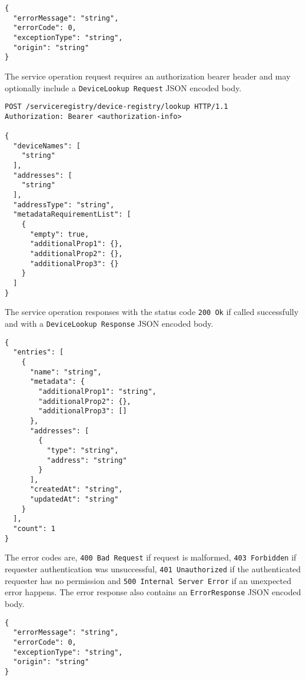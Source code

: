\documentclass[a4paper]{arrowhead}
\newcommand{\fref}[1]{{\textcolor{ArrowheadBlue}{\hyperref[sec:functions:#1]{#1}}}}
\begin{document}
\begin{lstlisting}[language=http,label={lst:register_response},caption={A \fref{register} error response.}]
{
  "errorMessage": "string",
  "errorCode": 0,
  "exceptionType": "string",
  "origin": "string"
}
\end{lstlisting}


The service operation request requires an authorization bearer header and may optionally include a \texttt{DeviceLookup
Request} JSON encoded body.

\begin{lstlisting}[language=http,label={lst:register},caption={A \fref{lookup} request.}]
POST /serviceregistry/device-registry/lookup HTTP/1.1
Authorization: Bearer <authorization-info>

{
  "deviceNames": [
    "string"
  ],
  "addresses": [
    "string"
  ],
  "addressType": "string",
  "metadataRequirementList": [
    {
      "empty": true,
      "additionalProp1": {},
      "additionalProp2": {},
      "additionalProp3": {}
    }
  ]
}
\end{lstlisting}

The service operation responses with the status code \texttt{200 Ok} if called successfully and with a \texttt{DeviceLookup
Response} JSON encoded body.

\begin{lstlisting}[language=http,label={lst:register_response},caption={A \fref{lookup} success response.}]
{
  "entries": [
    {
      "name": "string",
      "metadata": {
        "additionalProp1": "string",
        "additionalProp2": {},
        "additionalProp3": []
      },
      "addresses": [
        {
          "type": "string",
          "address": "string"
        }
      ],
      "createdAt": "string",
      "updatedAt": "string"
    }
  ],
  "count": 1
}
\end{lstlisting}

\newpage

The error codes are, \texttt{400 Bad Request} if request is malformed, \texttt{403 Forbidden} if requester authentication was unsuccessful, \texttt{401 Unauthorized} if the authenticated requester has no permission and \texttt{500 Internal Server Error} if an unexpected error happens. The error response also contains an \texttt{ErrorResponse} JSON encoded body.

\begin{lstlisting}[language=http,label={lst:register_response},caption={A \fref{lookup} error response.}]
{
  "errorMessage": "string",
  "errorCode": 0,
  "exceptionType": "string",
  "origin": "string"
}
\end{lstlisting}
\end{document}
